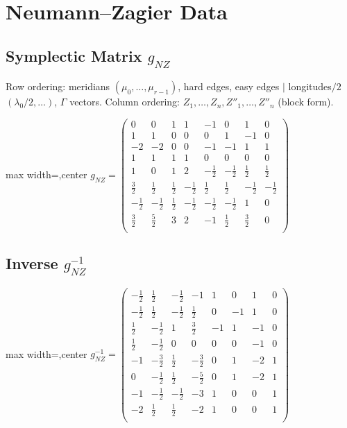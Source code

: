 \documentclass[11pt,a4paper]{article}
\begin{document}
\section{Neumann--Zagier Data}
\subsection{Symplectic Matrix $g_{NZ}$}
Row ordering: meridians $(\mu_0,\ldots,\mu_{r-1})$, hard edges, easy edges $\mid$ longitudes$/2$ $(\lambda_0/2,\ldots)$, $\Gamma$ vectors.
Column ordering: $Z_1,\ldots,Z_n, Z''_1,\ldots,Z''_n$ (block form).

\begin{adjustbox}{max width=\linewidth,center}
$\displaystyle g_{NZ} = 
\left(\begin{array}{cccccccc}
0 & 0 & 1 & 1 & -1 & 0 & 1 & 0 \\
1 & 1 & 0 & 0 & 0 & 1 & -1 & 0 \\
-2 & -2 & 0 & 0 & -1 & -1 & 1 & 1 \\
1 & 1 & 1 & 1 & 0 & 0 & 0 & 0 \\
1 & 0 & 1 & 2 & -\frac{1}{2} & -\frac{1}{2} & \frac{1}{2} & \frac{1}{2} \\
\frac{3}{2} & \frac{1}{2} & \frac{1}{2} & -\frac{1}{2} & \frac{1}{2} & \frac{1}{2} & -\frac{1}{2} & -\frac{1}{2} \\
-\frac{1}{2} & -\frac{1}{2} & \frac{1}{2} & -\frac{1}{2} & -\frac{1}{2} & -\frac{1}{2} & 1 & 0 \\
\frac{3}{2} & \frac{5}{2} & 3 & 2 & -1 & \frac{1}{2} & \frac{3}{2} & 0 \\
\end{array}\right)$
\end{adjustbox}

\subsection{Inverse $g_{NZ}^{-1}$}
\begin{adjustbox}{max width=\linewidth,center}
$\displaystyle g_{NZ}^{-1} = 
\left(\begin{array}{cccccccc}
-\frac{1}{2} & \frac{1}{2} & -\frac{1}{2} & -1 & 1 & 0 & 1 & 0 \\
-\frac{1}{2} & \frac{1}{2} & -\frac{1}{2} & \frac{1}{2} & 0 & -1 & 1 & 0 \\
\frac{1}{2} & -\frac{1}{2} & 1 & \frac{3}{2} & -1 & 1 & -1 & 0 \\
\frac{1}{2} & -\frac{1}{2} & 0 & 0 & 0 & 0 & -1 & 0 \\
-1 & -\frac{3}{2} & \frac{1}{2} & -\frac{3}{2} & 0 & 1 & -2 & 1 \\
0 & -\frac{1}{2} & \frac{1}{2} & -\frac{5}{2} & 0 & 1 & -2 & 1 \\
-1 & -\frac{1}{2} & -\frac{1}{2} & -3 & 1 & 0 & 0 & 1 \\
-2 & \frac{1}{2} & \frac{1}{2} & -2 & 1 & 0 & 0 & 1 \\
\end{array}\right)$
\end{adjustbox}
\end{document}
